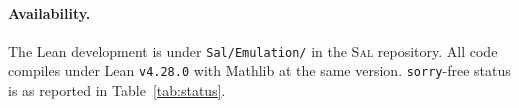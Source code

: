 \documentclass[11pt,a4paper]{article}
\theoremstyle{definition}
\theoremstyle{remark}
\newcommand{\Sal}{\textsc{Sal}}
\newcommand{\sorry}{\texttt{sorry}}
\begin{document}
\paragraph{Availability.}
The Lean development is under
\texttt{Sal/Emulation/} in the \Sal{} repository. All code compiles
under Lean \texttt{v4.28.0} with Mathlib at the same version.
\texttt{\sorry{}}-free status is as reported in
Table~\ref{tab:status}.



\end{document}
